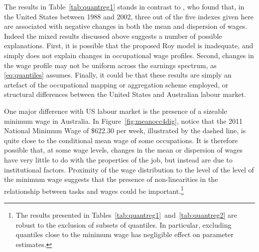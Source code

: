 The results in Table~\ref{tab:quantreg1} stands in contrast to \citet{Firpo2011}, who found that, in the United States between 1988 and 2002, three out of the five indexes given here are associated with negative changes in both the mean and dispersion of wages. Indeed the mixed results discussed above suggests a number of possible explanations. First, it is possible that the proposed Roy model is inadequate, and simply does not explain changes in occupational wage profiles. Second, changes in the wage profile may not be uniform across the earnings spectrum, as \eqref{eq:quantiles} assumes. Finally, it could be that these results are simply an artefact of the occupational mapping or aggregation scheme employed, or structural differences between the United States and Australian labour market.

One major difference with US labour market is the presence of a sizeable minimum wage in Australia. In Figure~\ref{fig:meanocc4dig}, notice that the 2011 National Minimum Wage of \$622.30 per week, illustrated by the dashed line, is quite close to the conditional mean wage of some occupations. It is therefore possible that, at some wage levels, changes in the mean or dispersion of wages have very little to do with the properties of the job, but instead are due to institutional factors. Proximity of the wage distribution to the level of the level of the minimum wage suggests that the presence of non-linearities in the relationship between tasks and wages could be important.\footnote{The results presented in Tables~\ref{tab:quantreg1}~and~\ref{tab:quantreg2} are robust to the exclusion of subsets of quantiles. In particular, excluding quantiles close to the minimum wage has negligible effect on parameter estimates.}

